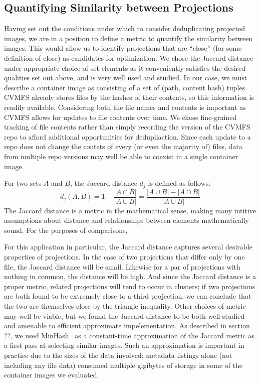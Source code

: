\documentclass[sigconf]{acmart}
\begin{document}
\subsection{Quantifying Similarity between Projections}

Having set out the conditions under which to consider deduplicating projected images,
we are in a position to define a metric to quantify the similarity between images.
This would allow us to identify projections that are ``close'' (for some definition of close) as candidates for optimization.
We chose the Jaccard distance under appropriate choice of set elements as it conveniently satisfies the desired qualities set out above,
and is very well used and studied.
In our case, we must describe a container image as consisting of a set of (path, content hash) tuples.
CVMFS already stores files by the hashes of their contents,
so this information is readily available.
Considering both the file names and contents is important as CVMFS allows for updates to file contents over time.
We chose fine-grained tracking of file contents rather than simply recording the version of the CVMFS repo to afford additional opportunities for dedupliaction.
Since each update to a repo does not change the contets of every (or even the majority of) files,
data from multiple repo versions may well be able to coexist in a single container image.

For two sets $A$ and $B$,
the Jaccard distance $d_j$ is defined as follows.
\[
d_j(A, B) = 1 - \frac{|A \cap B|}{|A \cup B|} = \frac{|A \cup B| - |A \cap B|}{|A \cup B|}
\]
The Jaccard distance is a metric in the mathematical sense,
making many intitive assumptions about distance and relationships between elements mathematically sound.
For the purposes of comparisons,

For this application in particular,
the Jaccard distance captures several desirable properties of projections.
In the case of two projections that differ only by one file,
the Jaccard distance will be small.
Likewise for a par of projections with nothing in common,
the distance will be high.
And since the Jaccard distance is a proper metric,
related projections will tend to occur in clusters;
if two projections are both found to be extremely close to a third projection,
we can conclude that the two are themselves close by the triangle inequality.
Other choices of metric may well be viable,
but we found the Jaccard distance to be both well-studied and amenable to efficient approximate impelementation.
As described in section ??,
we used MinHash~\cite{minhash} as a constant-time approximation of the Jaccard metric as a first pass at selecting similar images.
Such an approximation is important in practice due to the sizes of the data involved;
metadata listings alone (not including any file data) consumed multiple gigibytes of storage in some of the container images we evaluated.
\end{document}
